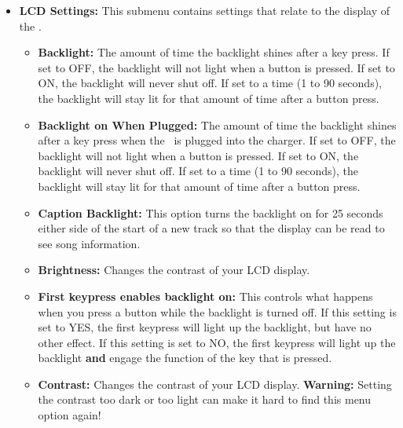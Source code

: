 \begin{itemize}
  \item \textbf{LCD Settings:  }
    This submenu contains settings that relate to the display of the \dap.
    \begin{itemize}
    \item \textbf{Backlight:  }
    The amount of time the backlight shines after a key press. If set to OFF, the backlight will not light when a button is pressed. If set to ON, the backlight will never shut off. If set to a time (1 to 90 seconds), the backlight will stay lit for that amount of time after a button press. 
    \item \textbf{Backlight on When Plugged:  }
    The amount of time the backlight shines after a key press when the \dap\ is plugged into the charger. If set to OFF, the backlight will not light when a button is pressed. If set to ON, the backlight will never shut off. If set to a time (1 to 90 seconds), the backlight will stay lit for that amount of time after a button press. 
    \item \textbf{Caption Backlight:} This option turns the backlight on for 25 seconds either side of the start of a new track so that the display can be read to see song information.
    \item \textbf{Brightness:}
    	Changes the contrast of your LCD display.
    \item \textbf{First keypress enables backlight on:}
    	This controls what happens when you press a button while the backlight is turned off.  If this setting is set to YES, the first keypress will light up the backlight, but have no other effect.  If this setting is set to NO, the first keypress will light up the backlight \textbf{and} engage the function of the key that is pressed.
    \item \textbf{Contrast:} Changes the contrast of your LCD display. \textbf{Warning:} Setting the contrast too dark or too light can make it hard to find this menu option again!

\end{itemize}
\end{itemize}
